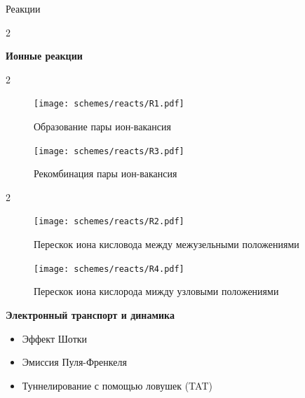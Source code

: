 \documentclass{beamer}%
\begin{document}
\begin{frame} {Реакции}

    \begin {multicols} {2}

    \textbf{Ионные реакции}
    \begin {multicols} {2}
    \begin{figure}
        
        \centering
        \texttt{[image: schemes/reacts/R1.pdf]}
        \caption{Образование пары ион-вакансия}
        
    \end{figure}

    \columnbreak
    \begin{figure}

        \centering
        \texttt{[image: schemes/reacts/R3.pdf]}
        \caption{Рекомбинация пары ион-вакансия}

    \end{figure}

    \end{multicols}

    \begin {multicols} {2}
        
    \begin{figure}

        \centering
        \texttt{[image: schemes/reacts/R2.pdf]}
        \caption{Перескок иона кисловода между межузельными положениями}

    \end{figure}
    \columnbreak
    \begin{figure}

        \centering
        \texttt{[image: schemes/reacts/R4.pdf]}
        \caption{Перескок иона кислорода мижду узловыми положениями}

    \end{figure}
    \end{multicols}

    \columnbreak

    \textbf{Электронный транспорт и динамика}
    \begin{itemize}
        \item Эффект Шотки
        \item Эмиссия Пуля-Френкеля
        \item Туннелирование с помощью ловушек (TAT)
    \end{itemize}

    \end{multicols}
\end{frame}
\end{document}
